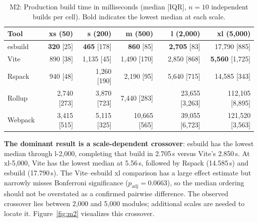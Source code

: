 \documentclass[preprint,12pt]{elsarticle}
\begin{document}
\begin{table}[htbp]
\centering
\caption{M2: Production build time in milliseconds (median [IQR], $n = 10$ independent builds per cell). Bold indicates the lowest median at each scale.}\label{tab:m2}
\begin{tabular}{@{}lrrrrr@{}}
\toprule
\textbf{Tool} & \textbf{xs (50)} & \textbf{s (200)} & \textbf{m (500)} & \textbf{l (2{,}000)} & \textbf{xl (5{,}000)} \\
\midrule
esbuild  & \textbf{320} [25] & \textbf{465} [178] & \textbf{860} [85] & \textbf{2{,}705} [83] & 17{,}790 [885] \\
Vite     & 890 [38] & 1{,}135 [45] & 1{,}490 [170] & 2{,}850 [868] & \textbf{5{,}560} [1{,}725] \\
Rspack   & 940 [48] & 1{,}260 [190] & 2{,}190 [95] & 5{,}640 [715] & 14{,}585 [343] \\
Rollup   & 2{,}740 [273] & 3{,}870 [723] & 7{,}440 [283] & 23{,}655 [3{,}263] & 112{,}105 [8{,}895] \\
Webpack  & 3{,}415 [515] & 5{,}115 [325] & 10{,}665 [565] & 39{,}055 [6{,}723] & 121{,}520 [3{,}563] \\
\bottomrule
\end{tabular}
\end{table}

\textbf{The dominant result is a scale-dependent crossover}: esbuild has the lowest median through l-2{,}000, completing that build in 2.705\,s versus Vite's 2.850\,s.
At xl-5{,}000, Vite has the lowest median at 5.56\,s, followed by Rspack (14.585\,s) and esbuild (17.790\,s).
The Vite--esbuild xl comparison has a large effect estimate but narrowly misses Bonferroni significance ($p_\text{adj}=0.0663$), so the median ordering should not be overstated as a confirmed pairwise difference.
The observed crossover lies between 2{,}000 and 5{,}000 modules; additional scales are needed to locate it.
Figure~\ref{fig:m2} visualizes this crossover.
\end{document}
